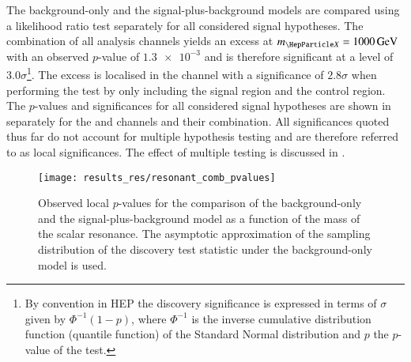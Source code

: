 %
The background-only and the signal-plus-background models are compared
using a likelihood ratio test separately for all considered signal
hypotheses. The combination of all analysis channels yields an excess
at $\mX = \SI{1000}{\GeV}$ with an observed $p$-value of
$\num{1.3e-3}$ and is therefore significant at a level of
$\num{3.0}\sigma$\footnote{By convention in HEP the discovery
  significance is expressed in terms of $\sigma$ given by
  $\Phi^{-1}(1 - p)$, where $\Phi^{-1}$ is the inverse cumulative
  distribution function (quantile function) of the Standard Normal
  distribution and $p$ the $p$-value of the test.}. The excess is
localised in the \hadhad channel with a significance of
$\num{2.8}\sigma$ when performing the test by only including the
\hadhad signal region and the \ZHF control region. The $p$-values and
significances for all considered signal hypotheses are shown in
 separately for the \lephad and \hadhad
channels and their combination. All significances quoted thus far do
not account for multiple hypothesis testing and are therefore referred
to as local significances. The effect of multiple testing is discussed
in .

\begin{figure}[htbp]
  \centering

  \texttt{[image: results\_res/resonant\_comb\_pvalues]}

  \caption{Observed local $p$-values for the comparison of the
    background-only and the signal-plus-background model as a function
    of the mass of the scalar resonance. The asymptotic approximation
    of the sampling distribution of the discovery test statistic under
    the background-only model is used.}%
  \label{fig:local_pvalues}

\end{figure}

